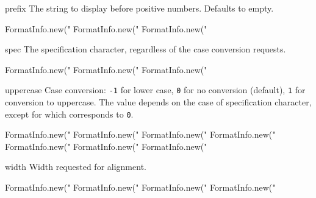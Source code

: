 \begin{urbiscriptapi}
\item[prefix]
  The string to display before positive numbers.  Defaults to empty.
\begin{urbiassert}
FormatInfo.new("%
FormatInfo.new("%
FormatInfo.new("%
\end{urbiassert}


\item[spec]
  The specification character, regardless of the case conversion
  requests.
\begin{urbiassert}
FormatInfo.new("%
FormatInfo.new("%
FormatInfo.new("%
\end{urbiassert}


\item[uppercase]
  Case conversion: \lstinline|-1| for lower case, \lstinline|0| for no
  conversion (default), \lstinline|1| for conversion to uppercase.
  The value depends on the case of specification character, except for
   which corresponds to \lstinline|0|.
\begin{urbiassert}
FormatInfo.new("%
FormatInfo.new("%
FormatInfo.new("%
FormatInfo.new("%
FormatInfo.new("%
FormatInfo.new("%
FormatInfo.new("%
\end{urbiassert}


\item[width]
  Width requested for alignment.
\begin{urbiassert}
FormatInfo.new("%
FormatInfo.new("%
FormatInfo.new("%
FormatInfo.new("%
\end{urbiassert}
\end{urbiscriptapi}

